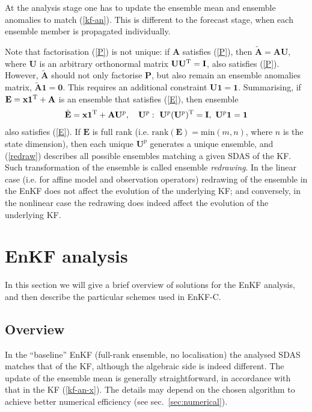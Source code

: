 \documentclass[11pt]{report}
\newcommand{\mb} {\mathbf}
\newcommand{\T}{^{\tiny \mathrm T}}
\begin{document}
At the analysis stage one has to update the ensemble mean and ensemble anomalies to match (\ref{kf-an}).
This is different to the forecast stage, when each ensemble member is propagated individually.

Note that factorisation (\ref{P}) is not unique: if $\mb A$ satisfies (\ref{P}), then $\tilde {\mb A} = \mb A \mb U$, where $\mb U$ is an arbitrary orthonormal matrix $\mb U \mb U\T = \mb I$, also satisfies (\ref{P}).
However, $\tilde{\mb A}$ should not only factorise $\mb P$, but also remain an ensemble anomalies matrix, $\tilde{\mb A} \mb 1 = \mb 0$.
This requires an additional constraint $\mb U \mb 1 = \mb 1$.
Summarising, if $\mb E = \mb x \mb 1\T + \mb A$ is an ensemble that satisfies (\ref{E}), then ensemble
\begin{align}
  \label{redraw}
  \tilde{\mb E} = \mb x \mb 1\T + \mb A \mb U^p, \quad \mb U^p:\ \mb U^p (\mb U^p)\T = \mb I,\ \mb U^p \mb 1 = \mb 1
\end{align}
also satisfies (\ref{E}). 
If $\mb E$ is full rank (i.e. $\mathrm{rank}(\mb E) = \mathrm{min}(m, n)$, where $n$ is the state dimension), then each unique $\mb U^p$ generates a unique ensemble, and (\ref{redraw}) describes all possible ensembles matching a given SDAS of the KF.
Such transformation of the ensemble is called ensemble \emph{redrawing}.
In the linear case (i.e. for affine model and observation operators) redrawing of the ensemble in the EnKF does not affect the evolution of the underlying KF; and conversely, in the nonlinear case the redrawing does indeed affect the evolution of the underlying KF.

\section{EnKF analysis}

In this section we will give a brief overview of solutions for the EnKF analysis, and then describe the particular schemes used in EnKF-C.

\subsection{Overview}

In the ``baseline'' EnKF (full-rank ensemble, no localisation) the analysed SDAS matches that of the KF, although the algebraic side is indeed different.
The update of the ensemble mean is generally straightforward, in accordance with that in the KF (\ref{kf-an-x}).
The details may depend on the chosen algorithm to achieve better numerical efficiency (see sec.~\ref{sec:numerical}).
\end{document}
